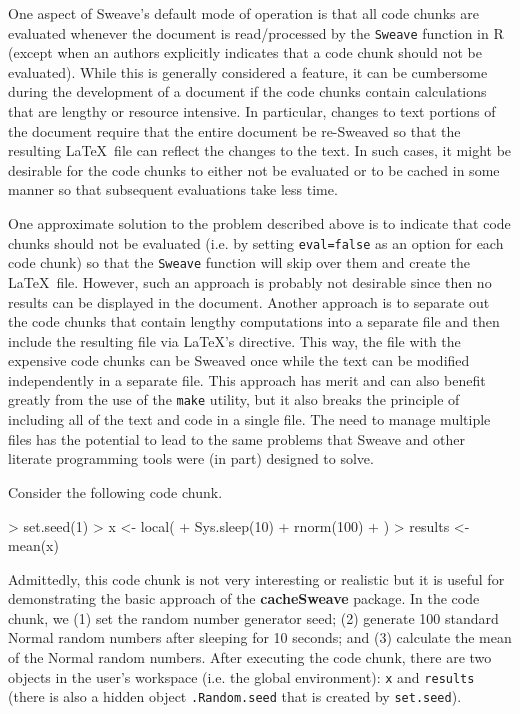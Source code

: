 \documentclass{article}
\newcommand{\proglang}{\textsf}
\newcommand{\code}{\texttt}
\newcommand{\pkg}{\textbf}
\begin{document}
One aspect of Sweave's default mode of operation is that all code
chunks are evaluated whenever the document is read/processed by the
\code{Sweave} function in \proglang{R} (except when an authors
explicitly indicates that a code chunk should not be evaluated).
While this is generally considered a feature, it can be cumbersome
during the development of a document if the code chunks contain
calculations that are lengthy or resource intensive.  In particular,
changes to text portions of the document require that the entire
document be re-Sweaved so that the resulting \LaTeX\ file can reflect
the changes to the text.  In such cases, it might be desirable for the
code chunks to either not be evaluated or to be cached in some manner
so that subsequent evaluations take less time.

One approximate solution to the problem described above is to indicate
that code chunks should not be evaluated (i.e. by setting
\code{eval=false} as an option for each code chunk) so that the
\code{Sweave} function will skip over them and create the
\LaTeX\ file.  However, such an approach is probably not desirable
since then no results can be displayed in the document.  Another
approach is to separate out the code chunks that contain lengthy
computations into a separate file and then include the resulting file
via \LaTeX's \verb++ directive.  This way, the file with the
expensive code chunks can be Sweaved once while the text can be
modified independently in a separate file.  This approach has merit
and can also benefit greatly from the use of the \code{make} utility,
but it also breaks the principle of including all of the text and code
in a single file.  The need to manage multiple files has the potential
to lead to the same problems that Sweave and other literate
programming tools were (in part) designed to solve.

Consider the following code chunk.
\begin{Schunk}
\begin{Sinput}
> set.seed(1)
> x <- local({
+     Sys.sleep(10)
+     rnorm(100)
+ })
> results <- mean(x)
\end{Sinput}
\end{Schunk}

Admittedly, this code chunk is not very interesting or realistic but
it is useful for demonstrating the basic approach of the
\pkg{cacheSweave} package.  In the code chunk, we (1) set the random
number generator seed; (2) generate 100 standard Normal random numbers
after sleeping for 10 seconds; and (3) calculate the mean of the
Normal random numbers.  After executing the code chunk, there are two
objects in the user's workspace (i.e. the global environment):
\code{x} and \code{results} (there is also a hidden object
\code{.Random.seed} that is created by \code{set.seed}).
\end{document}
